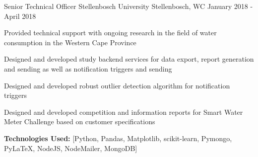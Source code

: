 \begin{cventries}
  \cventry
    {Senior Technical Officer} %
    {Stellenbosch University} %
    {Stellenbosch, WC} %
    {January 2018 - April 2018} %
    {
      \begin{cvitems} %
        \item {Provided technical support with ongoing research in the field of water consumption in the Western Cape Province}
        \item {Designed and developed study backend services for data export, report generation and sending as well as notification triggers and sending}
        \item {Designed and developed robust outlier detection algorithm for notification triggers }
        \item {Designed and developed competition and information reports for Smart Water Meter Challenge based on customer specifications}
        \item {\textbf{Technologies Used:} [Python, Pandas, Matplotlib, scikit-learn, Pymongo, PyLaTeX,
                                            NodeJS, NodeMailer,
                                            MongoDB]}
      \end{cvitems}
    }




\end{cventries}
